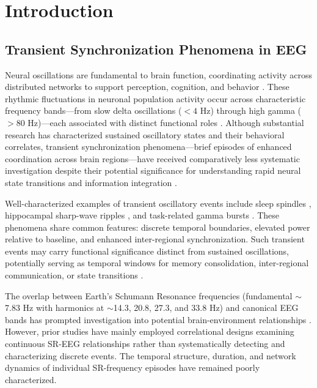 \documentclass[11pt,a4paper]{article}
\begin{document}
\newpage
\tableofcontents
\newpage

\section{Introduction}

\subsection{Transient Synchronization Phenomena in EEG}

Neural oscillations are fundamental to brain function, coordinating activity across distributed networks to support perception, cognition, and behavior \parencite{gy_rgy_buzs_ki_c98dac5c, pascal_fries_7b9d1ced}. These rhythmic fluctuations in neuronal population activity occur across characteristic frequency bands---from slow delta oscillations ($<4$ Hz) through high gamma ($>80$ Hz)---each associated with distinct functional roles \parencite{wolfgang_klimesch_be1f7786, engel2010beta, cohen2017where}. Although substantial research has characterized sustained oscillatory states and their behavioral correlates, transient synchronization phenomena---brief episodes of enhanced coordination across brain regions---have received comparatively less systematic investigation despite their potential significance for understanding rapid neural state transitions and information integration \parencite{siegel2012spectral, canolty2010functional}.

Well-characterized examples of transient oscillatory events include sleep spindles \parencite{fernandez2020sleep}, hippocampal sharp-wave ripples \parencite{buzsaki2015hippocampal}, and task-related gamma bursts \parencite{fries2001modulation}. These phenomena share common features: discrete temporal boundaries, elevated power relative to baseline, and enhanced inter-regional synchronization. Such transient events may carry functional significance distinct from sustained oscillations, potentially serving as temporal windows for memory consolidation, inter-regional communication, or state transitions \parencite{john_lisman_100e4cf6}.

The overlap between Earth's Schumann Resonance frequencies (fundamental $\sim$7.83 Hz with harmonics at $\sim$14.3, 20.8, 27.3, and 33.8 Hz) and canonical EEG bands has prompted investigation into potential brain-environment relationships \parencite{konig1974eeg, cherry2002schumann, persinger2008possible, saroka2016similar}. However, prior studies have mainly employed correlational designs examining continuous SR-EEG relationships rather than systematically detecting and characterizing discrete events. The temporal structure, duration, and network dynamics of individual SR-frequency episodes have remained poorly characterized.
\end{document}
